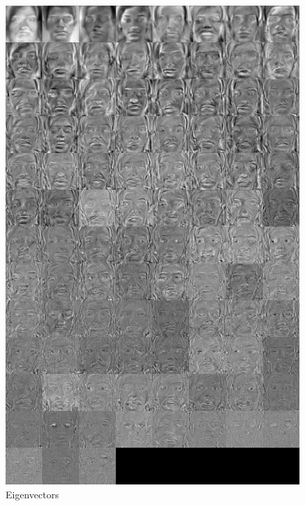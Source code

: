 \documentclass[12pt]{article}			%
\begin{document}
\begin{figure}
	\caption{Eigenvectors}
	\centering
\includegraphics[scale=0.2]{img/eigen.png}
\end{figure}
  
\end{document}

